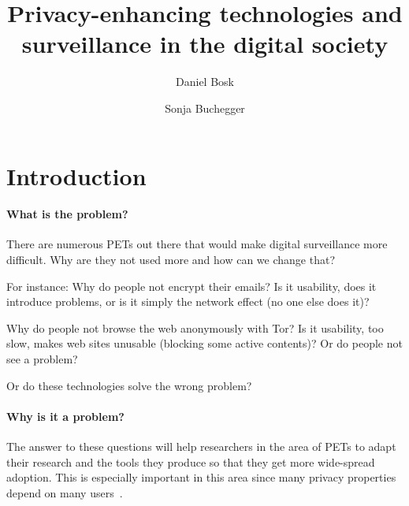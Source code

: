 \title{%
  Privacy-enhancing technologies and surveillance in the digital society
}
\author{Daniel Bosk}
\author{Sonja Buchegger}


\mode*

%  


\section{Introduction}

\paragraph{What is the problem?}

There are numerous \acp{PET} out there that would make digital surveillance 
more difficult.
Why are they not used more and how can we change that?

For instance: Why do people not encrypt their emails?
Is it usability, does it introduce problems, or is it simply the network effect 
(no one else does it)?

Why do people not browse the web anonymously with Tor?
Is it usability, \ie too slow, makes web sites unusable (blocking some active 
contents)?
Or do people not see a problem?

Or do these technologies solve the wrong problem?

\paragraph{Why is it a problem?}

The answer to these questions will help researchers in the area of \acp{PET} to 
adapt their research and the tools they produce so that they get more 
wide-spread adoption.
This is especially important in this area since many privacy properties depend 
on many users~\cite{AnonymityLovesCompany}.

